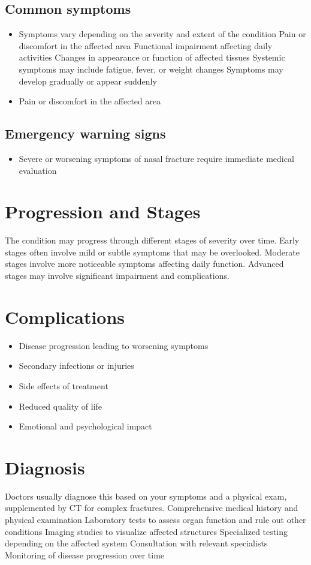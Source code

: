 \subsection{Common symptoms}
\begin{itemize}[noitemsep]
  \item Symptoms vary depending on the severity and extent of the condition Pain or discomfort in the affected area Functional impairment affecting daily activities Changes in appearance or function of affected tissues Systemic symptoms may include fatigue, fever, or weight changes Symptoms may develop gradually or appear suddenly
  \item Pain or discomfort in the affected area
  \end{itemize}

\subsection{Emergency warning signs}
\begin{itemize}[noitemsep]
  \item Severe or worsening symptoms of nasal fracture require immediate medical evaluation
\end{itemize}
\section{Progression and Stages}
The condition may progress through different stages of severity over time. Early stages often involve mild or subtle symptoms that may be overlooked. Moderate stages involve more noticeable symptoms affecting daily function. Advanced stages may involve significant impairment and complications.
\section{Complications}
\begin{itemize}[noitemsep]
  \item Disease progression leading to worsening symptoms
  \item Secondary infections or injuries
  \item Side effects of treatment
  \item Reduced quality of life
  \item Emotional and psychological impact
\end{itemize}
\section{Diagnosis}
Doctors usually diagnose this based on your symptoms and a physical exam, supplemented by CT for complex fractures. Comprehensive medical history and physical examination Laboratory tests to assess organ function and rule out other conditions Imaging studies to visualize affected structures Specialized testing depending on the affected system Consultation with relevant specialists Monitoring of disease progression over time


